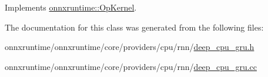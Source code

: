 Implements \mbox{\hyperlink{classonnxruntime_1_1OpKernel_a9eca8656a78b1b3ab9d3351a12798650}{onnxruntime\+::\+Op\+Kernel}}.



The documentation for this class was generated from the following files\+:\begin{DoxyCompactItemize}
\item 
onnxruntime/onnxruntime/core/providers/cpu/rnn/\mbox{\hyperlink{deep__cpu__gru_8h}{deep\+\_\+cpu\+\_\+gru.\+h}}\item 
onnxruntime/onnxruntime/core/providers/cpu/rnn/\mbox{\hyperlink{deep__cpu__gru_8cc}{deep\+\_\+cpu\+\_\+gru.\+cc}}\end{DoxyCompactItemize}
